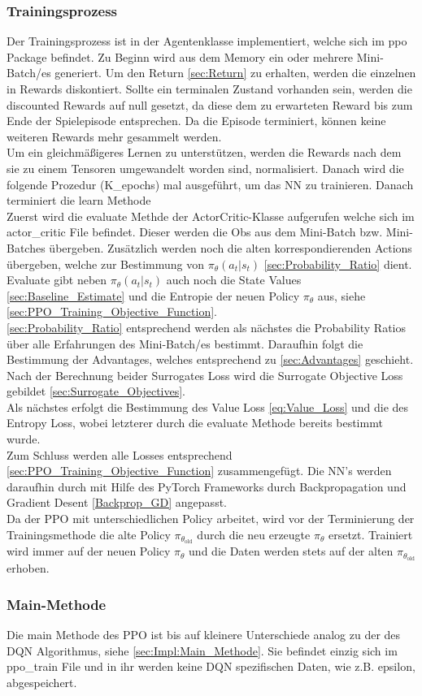 \subsubsection{Trainingsprozess}
Der Trainingsprozess ist in der Agentenklasse implementiert, welche sich im ppo Package befindet. Zu Beginn wird aus dem Memory ein oder mehrere Mini-Batch/es generiert. Um den Return \ref{sec:Return} zu erhalten, werden die einzelnen in Rewards diskontiert. Sollte ein terminalen Zustand vorhanden sein, werden die discounted Rewards auf null gesetzt, da diese dem zu erwarteten Reward bis zum Ende der Spielepisode entsprechen. Da die Episode terminiert, können keine weiteren Rewards mehr gesammelt werden.\\
Um ein gleichmäßigeres Lernen zu unterstützen, werden die Rewards nach dem sie zu einem Tensoren umgewandelt worden sind, normalisiert. Danach wird die folgende Prozedur (K\_epochs) mal ausgeführt, um das NN zu trainieren. Danach terminiert die learn Methode\\
Zuerst wird die evaluate Methde der ActorCritic-Klasse aufgerufen welche sich im actor\_critic File befindet. Dieser werden die Obs aus dem Mini-Batch bzw. Mini-Batches übergeben. Zusätzlich werden noch die alten korrespondierenden Actions übergeben, welche zur Bestimmung von $\pi_{\theta}(a_{t}|s_{t})$ \ref{sec:Probability_Ratio} dient. Evaluate gibt neben $\pi_{\theta}(a_{t}|s_{t})$ auch noch die State Values \ref{sec:Baseline_Estimate} und die Entropie der neuen Policy $\pi_{\theta}$ aus, siehe \ref{sec:PPO_Training_Objective_Function}.\\
\ref{sec:Probability_Ratio} entsprechend werden als nächstes die Probability Ratios über alle Erfahrungen des Mini-Batch/es bestimmt. Daraufhin folgt die Bestimmung der Advantages, welches entsprechend zu \ref{sec:Advantages} geschieht. Nach der Berechnung beider Surrogates Loss wird die Surrogate Objective Loss gebildet \ref{sec:Surrogate_Objectives}.\\
Als nächstes erfolgt die Bestimmung des Value Loss \ref{eq:Value_Loss} und die des Entropy Loss, wobei letzterer durch die evaluate Methode bereits bestimmt wurde.\\
Zum Schluss werden alle Losses entsprechend \ref{sec:PPO_Training_Objective_Function} zusammengefügt. Die NN's werden daraufhin durch mit Hilfe des PyTorch Frameworks durch Backpropagation und Gradient Desent \ref{Backprop_GD} angepasst.\\
Da der PPO mit unterschiedlichen Policy arbeitet, wird vor der Terminierung der Trainingsmethode die alte Policy $\pi_{\theta_{\text{old}}}$ durch die neu erzeugte $\pi_{\theta}$ ersetzt. Trainiert wird immer auf der neuen Policy $\pi_{\theta}$ und die Daten werden stets auf der alten $\pi_{\theta_{\text{old}}}$ erhoben.

\subsubsection{Main-Methode}
Die main Methode des PPO ist bis auf kleinere Unterschiede analog zu der des DQN Algorithmus, siehe \ref{sec:Impl:Main_Methode}. Sie befindet einzig sich im ppo\_train File und in ihr werden keine DQN spezifischen Daten, wie z.B. epsilon, abgespeichert. 
